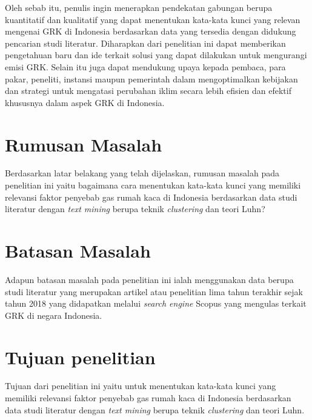 Oleh sebab itu, penulis ingin menerapkan pendekatan gabungan berupa kuantitatif dan kualitatif yang dapat menentukan kata-kata kunci yang relevan mengenai GRK di Indonesia berdasarkan data yang tersedia dengan didukung pencarian studi literatur. Diharapkan dari penelitian ini dapat memberikan pengetahuan baru dan ide terkait solusi yang dapat dilakukan untuk mengurangi emisi GRK. Selain itu juga dapat mendukung upaya kepada pembaca, para pakar, peneliti, instansi maupun pemerintah dalam mengoptimalkan kebijakan dan strategi untuk mengatasi perubahan iklim secara lebih efisien dan efektif khususnya dalam aspek GRK di Indonesia.
  
\section{Rumusan Masalah}
Berdasarkan latar belakang yang telah dijelaskan, rumusan masalah pada penelitian ini yaitu bagaimana cara menentukan kata-kata kunci yang memiliki relevansi faktor penyebab gas rumah kaca di Indonesia berdasarkan data studi literatur dengan \textit{text mining} berupa teknik \textit{clustering} dan teori Luhn? %


\section{Batasan Masalah}
Adapun batasan masalah pada penelitian ini ialah menggunakan data berupa studi literatur yang merupakan artikel atau penelitian lima tahun terakhir sejak tahun 2018 yang didapatkan melalui \textit{search engine} Scopus yang mengulas terkait GRK di negara Indonesia.
 
\section{Tujuan penelitian}
Tujuan dari penelitian ini yaitu untuk menentukan kata-kata kunci yang memiliki relevansi faktor penyebab gas rumah kaca di Indonesia berdasarkan data studi literatur dengan \textit{text mining} berupa teknik \textit{clustering} dan teori Luhn. %

